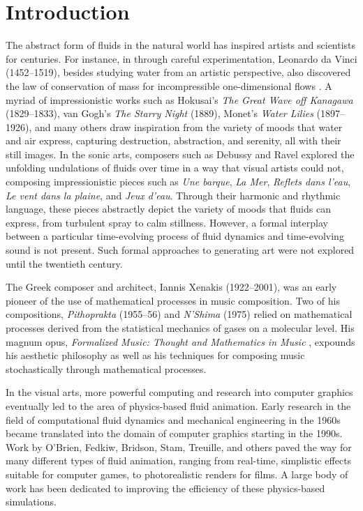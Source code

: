 \chapter{Introduction}

The abstract form of fluids in the natural world has inspired artists and scientists for centuries. 
For instance, in through careful experimentation, Leonardo da Vinci (1452--1519), besides studying water from an artistic perspective, also discovered the law of conservation of mass for incompressible one-dimensional flows \cite{gad1998fluid}. A myriad of impressionistic works such as Hokusai's {\em The Great Wave off Kanagawa} (1829--1833), van Gogh's {\em The Starry Night} (1889), Monet's {\em Water Lilies} (1897--1926), and many others draw inspiration from the variety of moods that water and air express, capturing destruction, abstraction, and serenity, all with their still images. In the sonic arts, composers such as Debussy and Ravel explored the unfolding undulations of fluids over time in a way that visual artists could not, composing impressionistic pieces such as {\em Une barque}, {\em La Mer}, {\em Reflets dans l'eau}, {\em Le vent dans la plaine}, and {\em Jeux d'eau}. Through their harmonic and rhythmic language, these pieces abstractly depict the variety of moods that fluids can express, from turbulent spray to calm stillness. However, a formal interplay between a particular time-evolving process of fluid dynamics and time-evolving sound is not present. Such formal approaches to generating art were not explored until the twentieth century.

The Greek composer and architect, Iannis Xenakis (1922--2001), was an early pioneer of the use of mathematical processes in music composition. Two of his compositions, {\em Pithoprakta} (1955--56) and {\em N'Shima} (1975) relied on mathematical processes derived from the statistical mechanics of gases on a molecular level. His magnum opus, {\em Formalized Music: Thought and Mathematics in Music} \cite{xenakis1992formalized}, expounds his aesthetic philosophy as well as his techniques for composing music stochastically through mathematical processes. 

In the visual arts, more powerful computing and research into computer graphics eventually led to the area of physics-based fluid animation. Early research in the field of computational fluid dynamics and mechanical engineering in the 1960s became translated into the domain of computer graphics starting in the 1990s. Work by O'Brien, Fedkiw, Bridson, Stam, Treuille, and others paved the way for many different types of fluid animation, ranging from real-time, simplistic effects suitable for computer games, to photorealistic renders for films. A large body of work has been dedicated to improving the efficiency of these physics-based simulations. 

